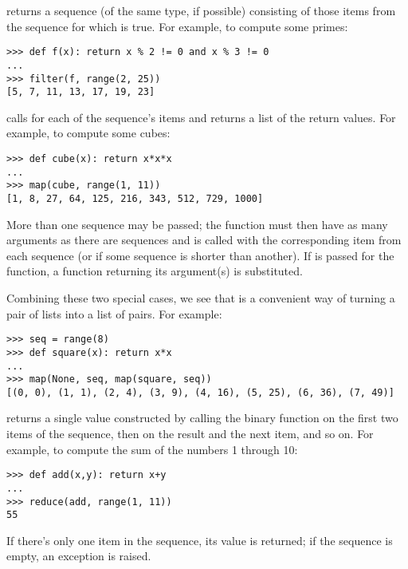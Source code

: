 \documentclass{manual}
\begin{document}
 returns a sequence (of
the same type, if possible) consisting of those items from the
sequence for which  is true.  For
example, to compute some primes:

\begin{verbatim}
>>> def f(x): return x % 2 != 0 and x % 3 != 0
...
>>> filter(f, range(2, 25))
[5, 7, 11, 13, 17, 19, 23]
\end{verbatim}

 calls
 for each of the sequence's items and
returns a list of the return values.  For example, to compute some
cubes:

\begin{verbatim}
>>> def cube(x): return x*x*x
...
>>> map(cube, range(1, 11))
[1, 8, 27, 64, 125, 216, 343, 512, 729, 1000]
\end{verbatim}

More than one sequence may be passed; the function must then have as
many arguments as there are sequences and is called with the
corresponding item from each sequence (or  if some sequence
is shorter than another).  If  is passed for the function,
a function returning its argument(s) is substituted.

Combining these two special cases, we see that
 is a convenient way of
turning a pair of lists into a list of pairs.  For example:

\begin{verbatim}
>>> seq = range(8)
>>> def square(x): return x*x
...
>>> map(None, seq, map(square, seq))
[(0, 0), (1, 1), (2, 4), (3, 9), (4, 16), (5, 25), (6, 36), (7, 49)]
\end{verbatim}

 returns a single value
constructed by calling the binary function  on the first two
items of the sequence, then on the result and the next item, and so
on.  For example, to compute the sum of the numbers 1 through 10:

\begin{verbatim}
>>> def add(x,y): return x+y
...
>>> reduce(add, range(1, 11))
55
\end{verbatim}

If there's only one item in the sequence, its value is returned; if
the sequence is empty, an exception is raised.
\end{document}
